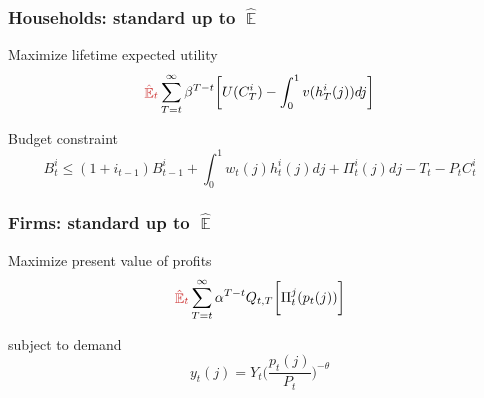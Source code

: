\documentclass[10pt]{beamer}
\DeclareMathOperator{\E}{\mathbb{E}}
\begin{document}
\begin{frame}
	\frametitle{Households: standard up to $\hat{\E}$}
	\label{HH}

Maximize lifetime expected utility
\begin{equation}
\textcolor{brownreddark}{\hat{\E}_t}\sum^{\infty}_{T=t}\beta^{T-t} \bigg[ U(C^i_T) - \int_0^1 v(h^i_T(j)) dj \bigg]
\label{lifetime_U}
\end{equation}	

Budget constraint
\begin{equation}
 B^i_t \leq (1+i_{t-1})B^i_{t-1} + \int_0^1 w_t(j)h^i_t(j) dj + \Pi_t^i(j)  dj-T_t -P_tC^i_t
 \label{BC}
\end{equation}



\vfill

\hfill \hyperlink{details_HHs_firms}{}
\end{frame}

\begin{frame}
	\frametitle{Firms: standard up to $\hat{\E}$}

Maximize present value of profits
\begin{equation}
\textcolor{brownreddark}{\hat{\E}_t}\sum^{\infty}_{T=t}\alpha^{T-t} Q_{t,T} \bigg[ \Pi^j_t(p_t(j))\bigg]
\label{lifetime_profits}
\end{equation}

subject to demand
\begin{equation}
y_t(j) = Y_t \bigg(\frac{p_t(j)}{P_t}\bigg)^{-\theta}
\end{equation}


\vfill

\hfill \hyperlink{details_HHs_firms}{}

\end{frame}
\end{document}
